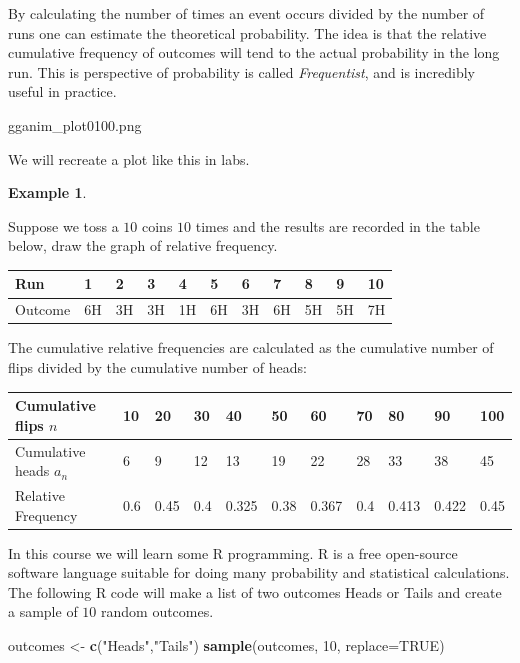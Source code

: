 \documentclass[
]{book}
\newenvironment{Shaded}{\begin{snugshade}}{\end{snugshade}}
\newcommand{\DataTypeTok}[1]{\textcolor[rgb]{0.13,0.29,0.53}{#1}}
\newcommand{\DecValTok}[1]{\textcolor[rgb]{0.00,0.00,0.81}{#1}}
\newcommand{\KeywordTok}[1]{\textcolor[rgb]{0.13,0.29,0.53}{\textbf{#1}}}
\newcommand{\NormalTok}[1]{#1}
\newcommand{\OtherTok}[1]{\textcolor[rgb]{0.56,0.35,0.01}{#1}}
\newcommand{\StringTok}[1]{\textcolor[rgb]{0.31,0.60,0.02}{#1}}
\theoremstyle{definition}
\theoremstyle{definition}
\newtheorem{example}{Example}[chapter]
\theoremstyle{definition}
\theoremstyle{definition}
\theoremstyle{remark}
\begin{document}
By calculating the number of times an event occurs divided by the number of runs one can estimate the theoretical probability. The idea is that the relative cumulative frequency of outcomes will tend to the actual probability in the long run. This is perspective of probability is called \emph{Frequentist}, and is incredibly useful in practice.

gganim\_plot0100.png

We will recreate a plot like this in labs.

\begin{example}
\protect\hypertarget{exm:freq}{}\label{exm:freq}

Suppose we toss a \(10\) coins \(10\) times and the results are recorded in the table below, draw the graph of relative frequency.

\begin{longtable}[]{@{}lllllllllll@{}}
\toprule
Run & 1 & 2 & 3 & 4 & 5 & 6 & 7 & 8 & 9 & 10\tabularnewline
\midrule
\endhead
Outcome & 6H & 3H & 3H & 1H & 6H & 3H & 6H & 5H & 5H & 7H\tabularnewline
\bottomrule
\end{longtable}

The cumulative relative frequencies are calculated as the cumulative number of flips divided by the cumulative number of heads:

\begin{longtable}[]{@{}lllllllllll@{}}
\toprule
Cumulative flips \(n\) & 10 & 20 & 30 & 40 & 50 & 60 & 70 & 80 & 90 & 100\tabularnewline
\midrule
\endhead
Cumulative heads \(a_n\) & 6 & 9 & 12 & 13 & 19 & 22 & 28 & 33 & 38 & 45\tabularnewline
Relative Frequency & 0.6 & 0.45 & 0.4 & 0.325 & 0.38 & 0.367 & 0.4 & 0.413 & 0.422 & 0.45\tabularnewline
\bottomrule
\end{longtable}

\end{example}

In this course we will learn some R programming. R is a free open-source software language suitable for doing many probability and statistical calculations. The following R code will make a list of two outcomes Heads or Tails and create a sample of \(10\) random outcomes.

\begin{Shaded}
\begin{Highlighting}[]
\NormalTok{outcomes <-}\StringTok{ }\KeywordTok{c}\NormalTok{(}\StringTok{"Heads"}\NormalTok{,}\StringTok{"Tails"}\NormalTok{)}
\KeywordTok{sample}\NormalTok{(outcomes, }\DecValTok{10}\NormalTok{, }\DataTypeTok{replace=}\OtherTok{TRUE}\NormalTok{)}
\end{Highlighting}
\end{Shaded}
\end{document}
